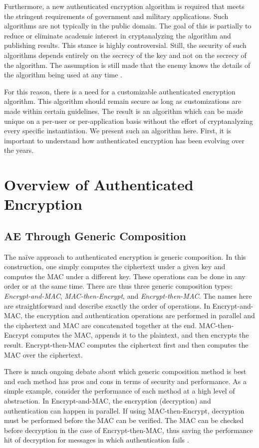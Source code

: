 Furthermore, a new authenticated encryption algorithm is required that meets the stringent requirements of government and military applications.
Such algorithms are not typically in the public domain.
The goal of this is partially to reduce or eliminate academic interest in cryptanalyzing the algorithm and publishing results.
This stance is highly controversial.
Still, the security of such algorithms depends entirely on the secrecy of the key and not on the secrecy of the algorithm.
The assumption is still made that the enemy knows the details of the algorithm being used at any time \cite{Kurdziel2002_BaselineRequirements}.

For this reason, there is a need for a customizable authenticated encryption algorithm.
This algorithm should remain secure as long as customizations are made within certain guidelines.
The result is an algorithm which can be made unique on a per-user or per-application basis without the effort of cryptanalyzing every specific instantiation.
We present such an algorithm here.
First, it is important to understand how authenticated encryption has been evolving over the years.

\section{Overview of Authenticated Encryption}
\subsection{AE Through Generic Composition}
The na{\"i}ve approach to authenticated encryption is generic composition.
In this construction, one simply computes the ciphertext under a given key and computes the MAC under a different key.
These operations can be done in any order or at the same time.
There are thus three generic composition types: \emph{Encrypt-and-MAC}, \emph{MAC-then-Encrypt}, and \emph{Encrypt-then-MAC}.
The names here are straightforward and describe exactly the order of operations.
In Encrypt-and-MAC, the encryption and authentication operations are performed in parallel and the ciphertext and MAC are concatenated together at the end.
MAC-then-Encrypt computes the MAC, appends it to the plaintext, and then encrypts the result.
Encrypt-then-MAC computes the ciphertext first and then computes the MAC over the ciphertext. 

There is much ongoing debate about which generic composition method is best and each method has pros and cons in terms of security and performance.
As a simple example, consider the performance of each method at a high level of abstraction.
In Encrypt-and-MAC, the encryption (decryption) and authentication can happen in parallel.
If using MAC-then-Encrypt, decryption must be performed before the MAC can be verified.
The MAC can be checked before decryption in the case of Encrypt-then-MAC, thus saving the performance hit of decryption for messages in which authentication fails \cite{Ferguson2010_CryptographyEngineering}.

